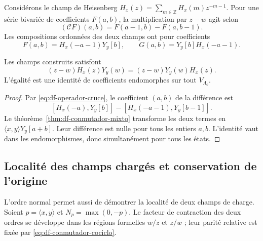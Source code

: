 
Considérons le champ de Heisenberg \(H_x(z)=\sum_{m\in\mathbb Z}H_x(m)z^{-m-1}\). Pour une série bivariée de coefficients \(F(a,b)\), la multiplication par \(z-w\) agit selon
\begin{equation}
 (\mathcal C F)(a,b)=F(a-1,b)-F(a,b-1).
 \label{eq:df-operador-cruce}
\end{equation}
Les compositions ordonnées des deux champs ont pour coefficients
\[
 F(a,b)=H_x(-a-1)Y_y[b],\qquad
 G(a,b)=Y_y[b]H_x(-a-1).
\]

\begin{theorem}
\label{thm:df-localidad-mixta} Les champs construits satisfont
\begin{equation}
 (z-w)H_x(z)Y_y(w)=(z-w)Y_y(w)H_x(z).
 \label{eq:df-localidad-mixta}
\end{equation}
L’égalité est une identité de coefficients endomorphes sur tout \(V_{\Lambda_o}\).
\end{theorem}

\begin{proof}
Par \eqref{eq:df-operador-cruce}, le coefficient \((a,b)\) de la différence est
\[
 [H_x(-a),Y_y[b]]-[H_x(-a-1),Y_y[b-1]].
\]
Le théorème~\ref{thm:df-conmutador-mixto} transforme les deux termes en \(\langle x,y\rangle Y_y[a+b]\). Leur différence est nulle pour tous les entiers \(a,b\). L’identité vaut dans les endomorphismes, donc simultanément pour tous les états.
\end{proof}

\subsection{Localité des champs chargés et conservation de l’origine}
\label{subsec:df-localidad-cargada}


L’ordre normal permet aussi de démontrer la localité de deux champs de charge. Soient \(p=\langle x,y\rangle\) et \(N_p=\max(0,-p)\). Le facteur de contraction des deux ordres se développe dans les régions formelles \(w/z\) et \(z/w\) ; leur parité relative est fixée par \eqref{eq:df-conmutador-cociclo}.

